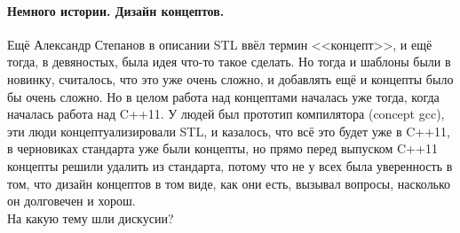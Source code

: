 \documentclass{article}
\begin{document}
    \paragraph{Немного истории. Дизайн концептов.}
    Ещё Александр Степанов в описании STL ввёл термин <<концепт>>, и ещё тогда, в девяностых, была идея что-то такое сделать. Но тогда и шаблоны были в новинку, считалось, что это уже очень сложно, и добавлять ещё и концепты было бы очень сложно. Но в целом работа над концептами началась уже тогда, когда началась работа над C++11. У людей был прототип компилятора (concept gcc), эти люди концептуализировали STL, и казалось, что всё это будет уже в C++11, в черновиках стандарта уже были концепты, но прямо перед выпуском C++11 концепты решили удалить из стандарта, потому что не у всех была уверенность в том, что дизайн концептов в том виде, как они есть, вызывал вопросы, насколько он долговечен и хорош.\\
    На какую тему шли дискусии?
\end{document}
